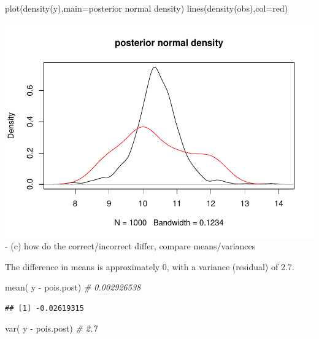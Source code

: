 \documentclass[
]{book}
\newenvironment{Shaded}{\begin{snugshade}}{\end{snugshade}}
\newcommand{\AttributeTok}[1]{\textcolor[rgb]{0.77,0.63,0.00}{#1}}
\newcommand{\CommentTok}[1]{\textcolor[rgb]{0.56,0.35,0.01}{\textit{#1}}}
\newcommand{\FunctionTok}[1]{\textcolor[rgb]{0.00,0.00,0.00}{#1}}
\newcommand{\NormalTok}[1]{#1}
\newcommand{\SpecialCharTok}[1]{\textcolor[rgb]{0.00,0.00,0.00}{#1}}
\newcommand{\StringTok}[1]{\textcolor[rgb]{0.31,0.60,0.02}{#1}}
\theoremstyle{definition}
\theoremstyle{definition}
\theoremstyle{definition}
\theoremstyle{definition}
\theoremstyle{remark}
\begin{document}
\begin{Shaded}
\begin{Highlighting}[]
  \FunctionTok{plot}\NormalTok{(}\FunctionTok{density}\NormalTok{(y),}\AttributeTok{main=}\StringTok{\textquotesingle{}posterior normal density\textquotesingle{}}\NormalTok{)}
  \FunctionTok{lines}\NormalTok{(}\FunctionTok{density}\NormalTok{(obs),}\AttributeTok{col=}\StringTok{\textquotesingle{}red\textquotesingle{}}\NormalTok{)}
\end{Highlighting}
\end{Shaded}

\includegraphics{_main_files/figure-latex/unnamed-chunk-40-2.pdf}
- (c) how do the correct/incorrect differ, compare means/variances

The difference in means is approximately 0, with a variance (residual) of 2.7.

\begin{Shaded}
\begin{Highlighting}[]
 \FunctionTok{mean}\NormalTok{( y }\SpecialCharTok{{-}}\NormalTok{ pois.post) }\CommentTok{\# 0.002926538}
\end{Highlighting}
\end{Shaded}

\begin{verbatim}
## [1] -0.02619315
\end{verbatim}

\begin{Shaded}
\begin{Highlighting}[]
 \FunctionTok{var}\NormalTok{( y }\SpecialCharTok{{-}}\NormalTok{ pois.post) }\CommentTok{\# 2.7}
\end{Highlighting}
\end{Shaded}
\end{document}
